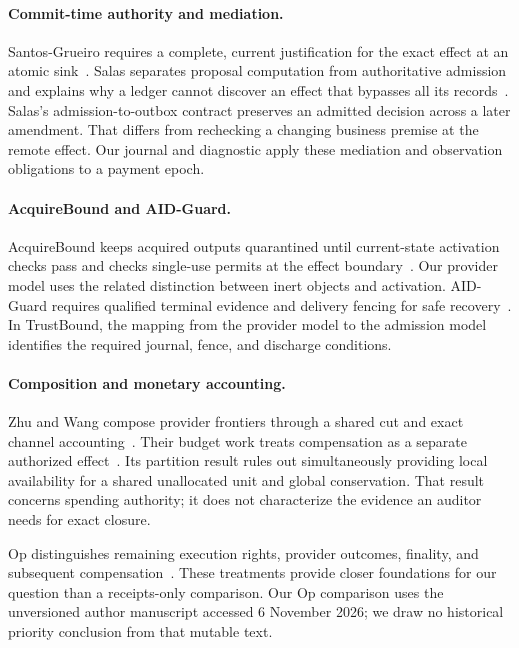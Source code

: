 \documentclass[letterpaper]{article}
\begin{document}
\paragraph{Commit-time authority and mediation.}
Santos-Grueiro requires a complete, current justification for the exact effect
at an atomic sink~\citep{cta}. Salas separates proposal computation from
authoritative admission and explains why a ledger cannot discover an effect
that bypasses all its records~\citep{salas}. Salas's admission-to-outbox
contract preserves an admitted decision across a later amendment. That differs
from rechecking a changing business premise at the remote effect. Our journal
and diagnostic apply these mediation and observation obligations to a payment
epoch.

\paragraph{AcquireBound and AID-Guard.}
AcquireBound keeps acquired outputs quarantined until current-state activation
checks pass and checks single-use permits at the effect boundary~\citep{acquirebound}.
Our provider model uses the related distinction between inert objects and
activation. AID-Guard requires qualified terminal evidence and delivery fencing
for safe recovery~\citep{aid}. In TrustBound, the mapping from the provider
model to the admission model identifies the required journal, fence, and
discharge conditions.

\paragraph{Composition and monetary accounting.}
Zhu and Wang compose provider frontiers through a shared cut and exact channel
accounting~\citep{quiescence}. Their budget work treats compensation as a separate
authorized effect~\citep{budget}. Its partition result rules out simultaneously
providing local availability for a shared unallocated unit and global conservation.
That result concerns spending authority; it does not characterize the evidence
an auditor needs for exact closure.

Op distinguishes remaining execution rights, provider outcomes, finality, and
subsequent compensation~\citep{op}. These treatments provide closer foundations
for our question than a receipts-only comparison. Our Op comparison uses the unversioned author manuscript accessed 6 November
2026; we draw no historical priority conclusion from that mutable text.
\end{document}
